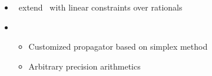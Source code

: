 \begin{frame}{\clingolpx}
  \begin{itemize}
  \item {} \ extend \clingo\ with linear constraints over rationals
  \item {} \
    \begin{itemize}
    \item Customized propagator based on simplex method
    \item Arbitrary precision arithmetics
    \end{itemize}
  \end{itemize}
\end{frame}
%
